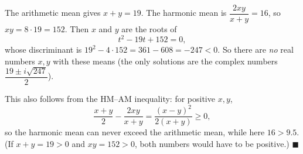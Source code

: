 The arithmetic mean gives $x+y=19$. The harmonic mean is $\dfrac{2xy}{x+y}=16$, so $xy=8\cdot19=152$. Then $x$ and $y$ are the roots of
\[
t^2-19t+152=0,
\]
whose discriminant is $19^2-4\cdot152=361-608=-247<0$. So there are \emph{no} real numbers $x,y$ with these means (the only solutions are the complex numbers $\dfrac{19\pm i\sqrt{247}}{2}$).

This also follows from the HM--AM inequality: for positive $x,y$,
\[
\dfrac{x+y}{2}-\dfrac{2xy}{x+y}=\dfrac{(x-y)^2}{2(x+y)}\ge0,
\]
so the harmonic mean can never exceed the arithmetic mean, while here $16>9.5$. (If $x+y=19>0$ and $xy=152>0$, both numbers would have to be positive.) $\blacksquare$
